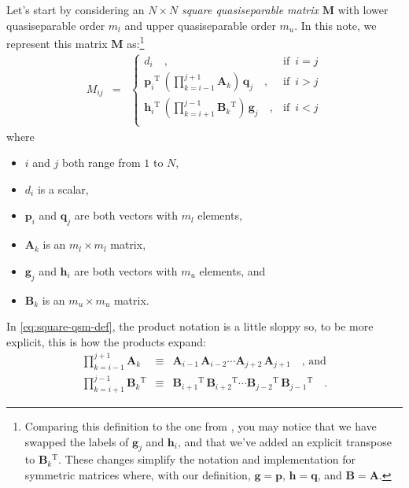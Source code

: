 \documentclass[modern]{aastex631}
\newcommand{\mv}[1]{\ensuremath{\boldsymbol{#1}}}
\newcommand{\mm}[1]{\ensuremath{\boldsymbol{#1}}}
\newcommand{\T}{\ensuremath{^\mathrm{T}}}
\begin{document}
Let's start by considering an $N \times N$ \emph{square quasiseparable matrix} $\mm{M}$ with lower quasiseparable order $m_l$ and upper quasiseparable order $m_u$.
In this note, we represent this matrix $\mm{M}$ as:\footnote{Comparing this definition to the one from \citet{Eidelman1999}, you may notice that we have swapped the labels of $\mv{g}_j$ and $\mv{h}_i$, and that we've added an explicit transpose to $\mm{B}_k\T$. These changes simplify the notation and implementation for symmetric matrices where, with our definition, $\mv{g} = \mv{p}$, $\mv{h} = \mv{q}$, and $\mm{B} = \mm{A}$.}
%
\begin{eqnarray}\label{eq:square-qsm-def}
    M_{ij} &=& \left \{ \begin{array}{ll}
        d_i\quad,                                                                   & \mbox{if }\, i = j \\
        \mv{p}_i\T\,\left ( \prod_{k=i-1}^{j+1} \mm{A}_k \right )\,\mv{q}_j\quad,   & \mbox{if }\, i > j \\
        \mv{h}_i\T\,\left ( \prod_{k=i+1}^{j-1} \mm{B}_k\T \right )\,\mv{g}_j\quad, & \mbox{if }\, i < j \\
    \end{array}\right .
\end{eqnarray}
%
where
%
\begin{itemize}
    \item $i$ and $j$ both range from $1$ to $N$,
    \item $d_i$ is a scalar,
    \item $\mv{p}_i$ and $\mv{q}_j$ are both vectors with $m_l$ elements,
    \item $\mm{A}_k$ is an $m_l \times m_l$ matrix,
    \item $\mv{g}_j$ and $\mv{h}_i$ are both vectors with $m_u$ elements, and
    \item $\mm{B}_k$ is an $m_u \times m_u$ matrix.
\end{itemize}
%
In \autoref{eq:square-qsm-def}, the product notation is a little sloppy so, to be more explicit, this is how the products expand:
%
\begin{eqnarray}
    \prod_{k=i-1}^{j+1} \mm{A}_k &\equiv& \mm{A}_{i-1}\,\mm{A}_{i-2}\cdots\mm{A}_{j+2}\,\mm{A}_{j+1}\quad\mbox{, and} \nonumber\\
    \prod_{k=i+1}^{j-1} \mm{B}_k\T &\equiv& \mm{B}_{i+1}\T\,\mm{B}_{i+2}\T\cdots\mm{B}_{j-2}\T\,\mm{B}_{j-1}\T \quad.
\end{eqnarray}
\end{document}
